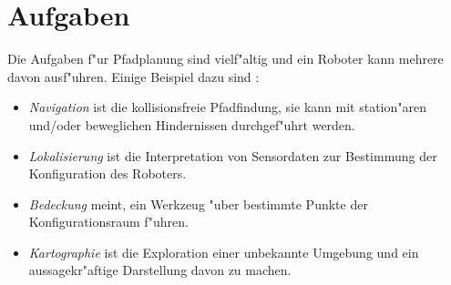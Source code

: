 \section{Aufgaben}

Die Aufgaben f"ur Pfadplanung sind vielf"altig und ein Roboter kann mehrere davon ausf"uhren. Einige Beispiel dazu sind \cite[~S. 9,10]{Principles:05}:
\begin{itemize}
	\item \textit{Navigation} ist die kollisionsfreie Pfadfindung, sie kann mit station"aren und/oder beweglichen Hindernissen durchgef"uhrt werden.
	\item \textit{Lokalisierung} ist die Interpretation von Sensordaten zur Bestimmung der Konfiguration des Roboters.
	\item \textit{Bedeckung} meint, ein Werkzeug "uber bestimmte Punkte der Konfigurationsraum f"uhren.
	\item \textit{Kartographie} ist die Exploration einer unbekannte Umgebung und ein aussagekr"aftige Darstellung davon zu machen.
\end{itemize}


